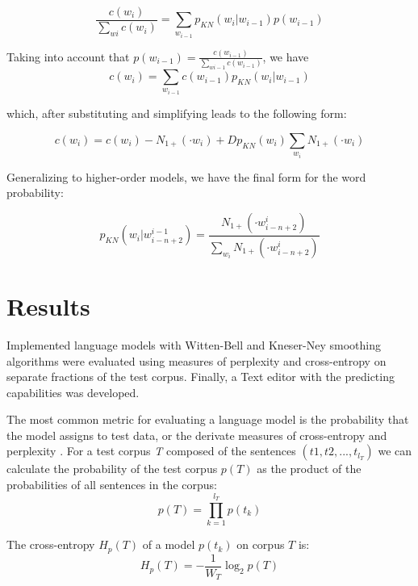 \documentclass[10pt, a4paper]{article}
\begin{document}
\begin{equation}
\frac{c(w_{i})}{\sum_{w{i}} c(w_{i})} = \sum_{w_{i-1}} p_{KN}(w_{i} | w_{i-1} )p(w_{i-1})
\end{equation}

Taking into account that $p(w_{i-1}) =\frac{c(w_{i-1})}{\sum_{w{i-1}} c(w_{i-1})} $, we have
\begin{equation}
c(w_{i}) = \sum_{w_{i-1}} c(w_{i-1}) p_{KN}(w_{i} | w_{i-1})
\end{equation}

which, after substituting and simplifying leads to the following form:

\begin{equation}
c(w_{i}) = c(w_{i}) - N_{1+}(\cdot w_{i}) + D p_{KN}(w_{i}) \sum_{w_{i}} N_{1+}(\cdot w_{i})
\end{equation}

Generalizing to higher-order models, we have the final form for the word probability:

\begin{equation}
p_{KN}(w_{i} | w_{i-n+2}^{i-1}) = \frac{N_{1+}(\cdot w_{i-n+2}^{i})}{\sum_{w_{i}}N_{1+}(\cdot w_{i-n+2}^{i})} 
\end{equation}

\section{Results}

Implemented language models with Witten-Bell and Kneser-Ney smoothing algorithms were evaluated using measures of perplexity and cross-entropy on separate fractions of the test corpus. Finally, a Text editor with the predicting capabilities was developed.

The most common metric for evaluating a language model is the probability that the model assigns to test data, or the derivate measures of cross-entropy and perplexity \cite{1_chen1999empirical}. For a test corpus \textit{T} composed of the sentences $(t1, t2 , ..., t_{l_{T}})$ we can calculate the probability of the test corpus $p(T)$ as the product of the probabilities of all sentences in the corpus:
\begin{equation}
p(T) = \prod_{k=1}^{l_{T}} p(t_{k})
\end{equation}

The cross-entropy $H_{p}(T)$ of a model $p(t_{k})$ on corpus $T$ is:
\begin{equation}
H_{p}(T) = - \frac{1}{W_{T}} \log_{2} p(T)
\end{equation}
\end{document}
